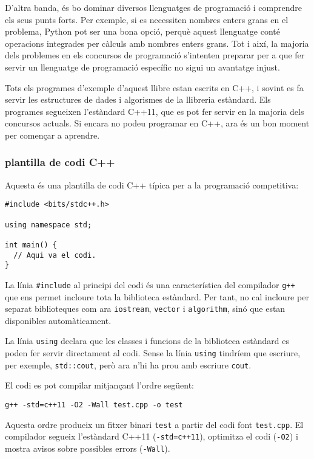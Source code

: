 D'altra banda, és bo
dominar diversos llenguatges de programació i comprendre
els seus punts forts.
Per exemple, si es necessiten nombres enters grans
en el problema,
Python pot ser una bona opció, perquè aquest
llenguatge
conté operacions integrades per
càlculs amb nombres enters grans.
Tot i així, la majoria dels problemes en els concursos de programació
s'intenten preparar per a que
fer servir un llenguatge de programació específic
no sigui un avantatge injust.

Tots els programes d'exemple d'aquest llibre estan escrits en C++,
i sovint es fa servir les estructures de dades i algorismes de
la llibreria estàndard.
Els programes segueixen l'estàndard C++11,
que es pot fer servir en la majoria dels concursos actuals.
Si encara no podeu programar en C++,
ara és un bon moment per començar a aprendre.

\subsubsection{plantilla de codi C++}

Aquesta és una plantilla de codi C++ típica per a la
programació competitiva:

\begin{lstlisting}
#include <bits/stdc++.h>

using namespace std;

int main() {
  // Aqui va el codi.
}
\end{lstlisting}

La línia \texttt{\#include} al principi
del codi és una característica del compilador \texttt{g++}
que ens permet incloure tota la biblioteca estàndard.
Per tant, no cal incloure per separat
biblioteques com ara \texttt{iostream},
\texttt{vector} i \texttt{algorithm},
sinó que estan disponibles automàticament.

La línia \texttt{using} declara
que les classes i funcions
de la biblioteca estàndard es poden fer servir directament
al codi.
Sense la línia \texttt{using} tindríem
que escriure, per exemple, \texttt{std::cout},
però ara n'hi ha prou amb escriure \texttt{cout}.

El codi es pot compilar mitjançant l'ordre següent:

\begin{lstlisting}
g++ -std=c++11 -O2 -Wall test.cpp -o test
\end{lstlisting}

Aquesta ordre produeix un fitxer binari \texttt{test}
a partir del codi font \texttt{test.cpp}.
El compilador segueix l'estàndard C++11
(\texttt{-std=c++11}),
optimitza el codi (\texttt{-O2})
i mostra avisos sobre possibles errors (\texttt{-Wall}).

